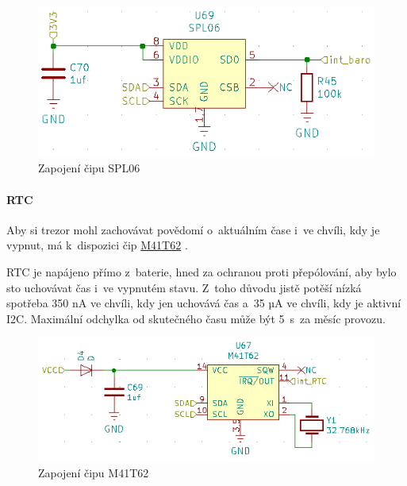 \begin{figure}[h]
    \centering
    \includegraphics[width=\textwidth]{kapitoly/obrazky/E4/vnimani/SPL06.png}
    \caption{Zapojení čipu SPL06}
    \label{fig:E4-SPL06}
\end{figure}

\newpage

\paragraph{RTC}
\label{RTC}
Aby si trezor mohl zachovávat povědomí o~aktuálním čase i~ve chvíli, kdy je vypnut, má k~dispozici čip 
\href{https://datasheet.lcsc.com/szlcsc/STMicroelectronics-M41T62Q6F_C113207.pdf}{M41T62} \parencite{m41t62}.

RTC je napájeno přímo z~baterie, hned za ochranou proti přepólování, aby bylo sto uchovávat čas i~ve vypnutém stavu.
Z~toho důvodu jistě potěší nízká spotřeba 350 nA ve chvíli, kdy jen uchovává čas a~35 µA ve chvíli, kdy je aktivní I2C.
Maximální odchylka od skutečného času může být 5~s~za měsíc provozu.

\begin{figure}[h]
    \centering
    \includegraphics[width=\textwidth]{kapitoly/obrazky/E4/vnimani/RTC.png}
    \caption{Zapojení čipu M41T62}
    \label{fig:E4-M41T62}
\end{figure}

\newpage

